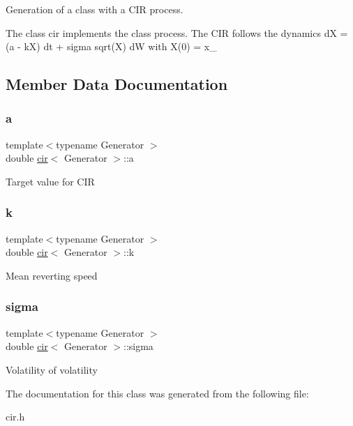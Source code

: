 Generation of a class with a C\+IR process. 

The class cir implements the class process. The C\+IR follows the dynamics dX = (a -\/ kX) dt + sigma sqrt(\+X) dW with X(0) = x\+\_ 

\subsection{Member Data Documentation}
\mbox{\label{classcir_a358578305ea60d31c00546233304651c}} 
\subsubsection{\texorpdfstring{a}{a}}
{\footnotesize\ttfamily template$<$typename Generator $>$ \\
double \mbox{\hyperlink{classcir}{cir}}$<$ Generator $>$\+::a\hspace{0.3cm}{\ttfamily [protected]}}

Target value for C\+IR \mbox{\label{classcir_aa5b05ff03ee8bb587ea94426a9ce704b}} 
\subsubsection{\texorpdfstring{k}{k}}
{\footnotesize\ttfamily template$<$typename Generator $>$ \\
double \mbox{\hyperlink{classcir}{cir}}$<$ Generator $>$\+::k\hspace{0.3cm}{\ttfamily [protected]}}

Mean reverting speed \mbox{\label{classcir_a76df757acc0179e1cdf766ed6627efc9}} 
\subsubsection{\texorpdfstring{sigma}{sigma}}
{\footnotesize\ttfamily template$<$typename Generator $>$ \\
double \mbox{\hyperlink{classcir}{cir}}$<$ Generator $>$\+::sigma\hspace{0.3cm}{\ttfamily [protected]}}

Volatility of volatility 

The documentation for this class was generated from the following file\+:\begin{DoxyCompactItemize}
\item 
cir.\+h\end{DoxyCompactItemize}
